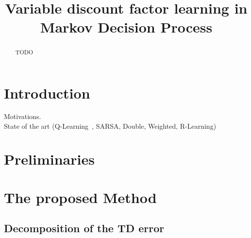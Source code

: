\documentclass[conference]{IEEEtran}
\begin{document}
\title{Variable discount factor learning in Markov Decision Process}


\author{
}


\maketitle

\begin{abstract}
TODO
\end{abstract}



%
\IEEEpeerreviewmaketitle



\section{Introduction}
Motivations. \\

State of the art (Q-Learning~\cite{watkins1992q}, SARSA, Double, Weighted, R-Learning)


\section{Preliminaries}

\section{The proposed Method}

\subsection{Decomposition of the TD error}
\end{document}
